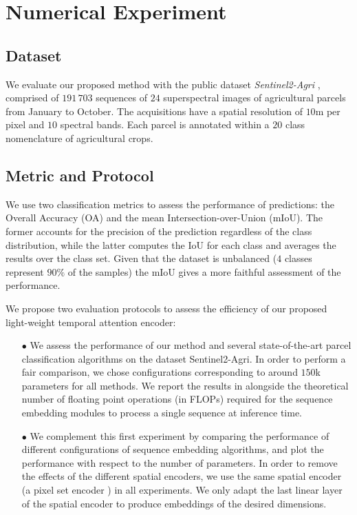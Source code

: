 \documentclass[runningheads]{llncs}
\begin{document}
 \section{Numerical Experiment}
\subsection{Dataset}
We evaluate our proposed method with the public dataset \emph{Sentinel2-Agri} \cite{garnot2019satellite}, comprised of $191\,703$ sequences of $24$ superspectral images of agricultural parcels from January to October. The acquisitions have a spatial resolution of $10$m per pixel and $10$ spectral bands. Each parcel is annotated within a $20$ class nomenclature of agricultural crops.
\subsection{Metric and Protocol}
We use two classification metrics to assess the performance of predictions: the Overall Accuracy (OA) and the mean Intersection-over-Union (mIoU). The former accounts for the precision of the prediction regardless of the class distribution, while the latter computes the IoU for each class and averages the results over the class set. Given that the dataset is unbalanced ($4$ classes represent $90\%$ of the samples) the mIoU gives a more faithful assessment of the performance. 

We propose two evaluation protocols to assess the efficiency of our proposed light-weight temporal attention encoder:
\begin{itemize}
    \item[$\bullet$] We assess the performance of our method and several state-of-the-art parcel classification algorithms on the dataset Sentinel2-Agri.
    In order to perform a fair comparison, we chose configurations corresponding to around $150$k parameters for all methods. We report the results in  alongside the theoretical number of floating point operations (in FLOPs) required for the sequence embedding modules to process a single sequence at inference time.
    \item[$\bullet$]
    We complement this first experiment by comparing the performance of  different configurations of sequence embedding algorithms, and plot the performance with respect to the number of parameters. 
    In order to remove the effects of the different spatial encoders, we use the same spatial encoder (a pixel set encoder \cite{garnot2019satellite}) in all experiments. We only adapt the last linear layer of the spatial encoder to produce embeddings of the desired dimensions.
\end{itemize}
\end{document}

